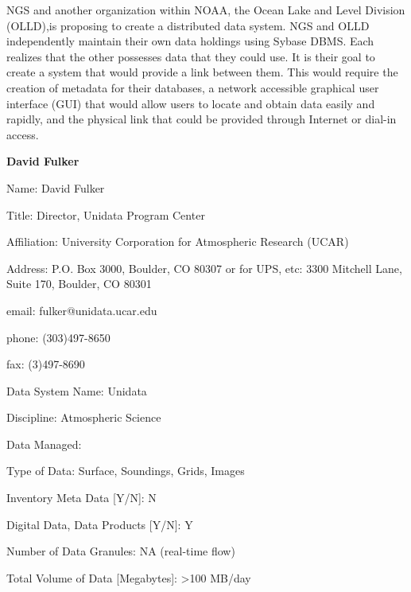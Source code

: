 	NGS and another organization within NOAA, the Ocean Lake and Level 
Division (OLLD),is proposing to create a distributed data system.  NGS and 
OLLD independently maintain their own data holdings using Sybase DBMS.  
Each realizes that the other possesses data that they could use.  It is their 
goal to create a system that would provide a link between them.  This 
would require the creation of metadata for their databases, a network 
accessible graphical user interface (GUI) that would allow users to locate 
and obtain data easily and rapidly, and the physical link that could be 
provided through Internet or dial-in access.
\newpage

\begin{center}
\LARGE
{\bf  David Fulker}
\end{center}
\large
{}
\normalsize
\smallskip
\begin{description}
\item{Name:}  David Fulker
\item{Title:}  Director, Unidata Program Center
\item{Affiliation:}  University Corporation for Atmospheric Research 
(UCAR)
\item{Address:}  P.O. Box 3000, Boulder, CO  80307 
			or for UPS, etc:  3300 Mitchell Lane, Suite 170, Boulder, 
			CO  80301
\item{email:}  fulker@unidata.ucar.edu
\item{phone:}  (303)497-8650
\item{fax:}  (3)497-8690
\end{description}
\medskip
\large
{}
\normalsize
\medskip
\begin{description}

\item{Data System Name:}  Unidata
\item{Discipline:}  Atmospheric Science
\item{Data Managed:}
	\begin{description}
	\item{Type of Data:}  Surface, Soundings, Grids, Images
	\item{Inventory Meta Data [Y/N]:}  N
	\item{Digital Data, Data Products [Y/N]:}  Y
	\item{Number of Data Granules:}  NA (real-time flow)
	\item{Total Volume of Data [Megabytes]:}  >100 MB/day
	\end{description}
\end{description}

